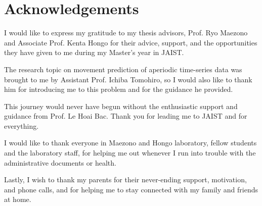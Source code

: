 \chapter*{Acknowledgements}

I would like to express my gratitude to my thesis advisors, Prof. Ryo Maezono and Associate Prof. Kenta Hongo for their advice, support, and the opportunities they have given to me during my Master's year in JAIST.

The research topic on movement prediction of aperiodic time-series data was brought to me by Assistant Prof. Ichiba Tomohiro, so I would also like to thank him for introducing me to this problem and for the guidance he provided.

This journey would never have begun without the enthusiastic support and guidance from Prof. Le Hoai Bac. Thank you for leading me to JAIST and for everything.

I would like to thank everyone in Maezono and Hongo laboratory, fellow students and the laboratory staff, for helping me out whenever I run into trouble with the administrative documents or health.

Lastly, I wish to thank my parents for their never-ending support, motivation, and phone calls, and for helping me to stay connected with my family and friends at home.
